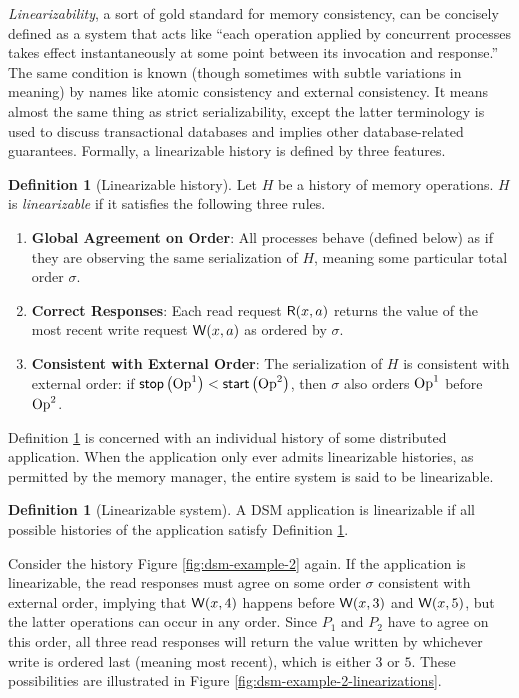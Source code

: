 \documentclass[]             %
{NASA}                       %
\theoremstyle{definition}
\newtheorem{definition}[theorem]{Definition}
\providecommand{\tightlist}{%
  \setlength{\itemsep}{0pt}\setlength{\parskip}{0pt}}
\begin{document}
\emph{Linearizability}, a sort of gold standard for memory
consistency, can be concisely defined as a system that acts like
``each operation applied by concurrent processes takes effect
instantaneously at some point between its invocation and response.''
\cite{10.1145/78969.78972} The same condition is known (though
sometimes with subtle variations in meaning) by names like atomic
consistency and external consistency. It means almost the same thing
as strict serializability, except the latter terminology is used to
discuss transactional databases and implies other database-related
guarantees. Formally, a linearizable history is defined by three
features.
\begin{definition}[Linearizable history]
  \label{def:linearizable-history}
  Let $H$ be a history of memory operations. $H$ is
  \emph{linearizable} if it satisfies the following three rules.
\begin{enumerate}
  \tightlist
\item \textbf{Global Agreement on Order}: All processes behave
  (defined below) as if they are observing the same serialization of
  $H$, meaning some particular total order $\sigma$.
\item \textbf{Correct Responses}: Each read request
  \(\mathsf{R}\!\left(x, a\right)\) returns the value of the most recent write
  request \(\mathsf{W}\!\left(x, a\right)\) as ordered by $\sigma$.
\item \textbf{Consistent with External Order}: The serialization of
  $H$ is consistent with external order: if
  $\mathsf{stop}\left(\mathrm{Op}^1\right) < \mathsf{start}\left(\mathrm{Op}^2\right)$, then $\sigma$ also orders
  $\mathrm{Op}^1$ before $\mathrm{Op}^2$.
\end{enumerate}
\end{definition}

Definition \ref{def:linearizable-history} is concerned with an
individual history of some distributed application. When the
application only ever admits linearizable histories, as permitted by
the memory manager, the entire system is said to be linearizable.

\begin{definition}[Linearizable system]
  \label{def:linearizable-system}
  A DSM application is linearizable if all possible histories of the
  application satisfy Definition \ref{def:linearizable-history}.
\end{definition}

Consider the history Figure \ref{fig:dsm-example-2} again. If the
application is linearizable, the read responses must agree on some
order $\sigma$ consistent with external order, implying that
$\mathsf{W}\!\left(x, 4\right)$ happens before $\mathsf{W}\!\left(x, 3\right)$ and
$\mathsf{W}\!\left(x, 5\right)$, but the latter operations can occur in any
order. Since $P_1$ and $P_2$ have to agree on this order, all three
read responses will return the value written by whichever write is
ordered last (meaning most recent), which is either $3$ or $5$. These
possibilities are illustrated in Figure
\ref{fig:dsm-example-2-linearizations}.
\end{document}
